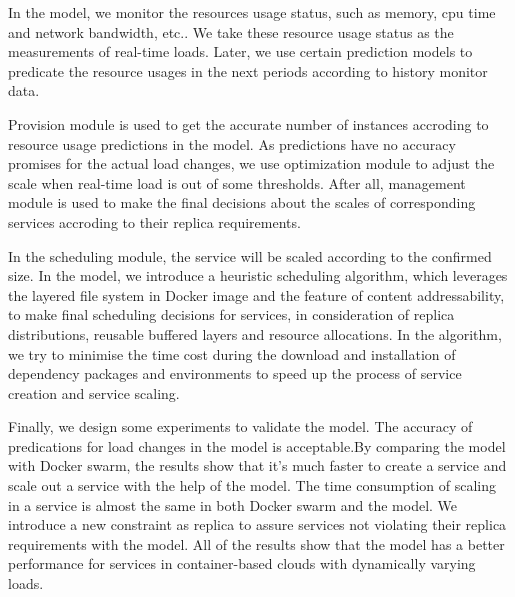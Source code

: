 \begin{englishabstract}
In the model, we monitor the resources usage status, such as memory, cpu time and network bandwidth, etc.. We take these resource usage status as the measurements of real-time loads. Later, we use certain prediction models to predicate the resource usages in the next periods according to history monitor data.

Provision module is used to get the accurate number of instances accroding to resource usage predictions in the model. As predictions have no accuracy promises for the actual load changes, we use optimization module to adjust the scale when real-time load is out of some thresholds. After all, management module is used to make the final decisions about the scales of corresponding services accroding to their replica requirements.

In the scheduling module, the service will be scaled according to the confirmed size. In the model, we introduce a heuristic scheduling algorithm, which leverages the layered file system in Docker image and the feature of content addressability, to make final scheduling decisions for services, in consideration of replica distributions, reusable buffered layers and resource allocations. In the algorithm, we try to minimise the time cost during the download and installation of dependency packages and environments to speed up the process of service creation and service scaling.

Finally, we design some experiments to validate the model. The accuracy of predications for load changes in the model is acceptable.By comparing the model with Docker swarm, the results show that it's much faster to create a service and scale out a service with the help of the model. The time consumption of scaling in a service is almost the same in both Docker swarm and the model. We introduce a new constraint as replica to assure services not violating their replica requirements with the model. All of the results show that the model has a better performance for services in container-based clouds with dynamically varying loads.

\end{englishabstract}
